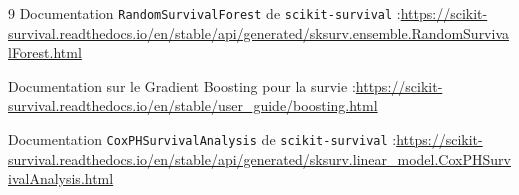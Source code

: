 \documentclass[12pt,a4paper]{article}
\begin{document}
\begin{thebibliography}{9}
Documentation \texttt{RandomSurvivalForest} de \texttt{scikit-survival} :\url{https://scikit-survival.readthedocs.io/en/stable/api/generated/sksurv.ensemble.RandomSurvivalForest.html}

Documentation sur le Gradient Boosting pour la survie :\url{https://scikit-survival.readthedocs.io/en/stable/user_guide/boosting.html}

Documentation \texttt{CoxPHSurvivalAnalysis} de \texttt{scikit-survival} :\url{https://scikit-survival.readthedocs.io/en/stable/api/generated/sksurv.linear_model.CoxPHSurvivalAnalysis.html}
\end{thebibliography}
\end{document}
